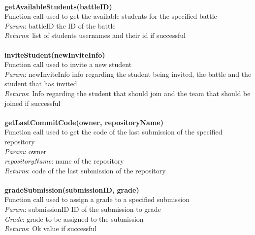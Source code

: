 \documentclass{article}
\begin{document}
\\
\textbf{getAvailableStudents(battleID)}\\
Function call used to get the available students for the specified battle\\
\textit{Param}: battleID the ID of the battle\\
\textit{Returns}: list of students usernames and their id if successful\\
\\
\textbf{inviteStudent(newInviteInfo)}\\
Function call used to invite a new student\\
\textit{Param}: newInviteInfo info regarding the student being invited, the battle and the student that has invited\\
\textit{Returns}: Info regarding the student that should join and the team that should be joined if successful\\
\\
\textbf{getLastCommitCode(owner, repositoryName)}\\
Function call used to get the code of the last submission of the specified repository\\
\textit{Param}: owner\\
\textit{repositoryName}: name of the repository\\
\textit{Returns}: code of the last submission of the repository\\
\\
\textbf{gradeSubmission(submissionID, grade)}\\
Function call used to assign a grade to a specified submission\\
\textit{Param}: submissionID ID of the submission to grade\\
\textit{Grade}: grade to be assigned to the submission\\
\textit{Returns}: Ok value if successful\\
\end{document}
